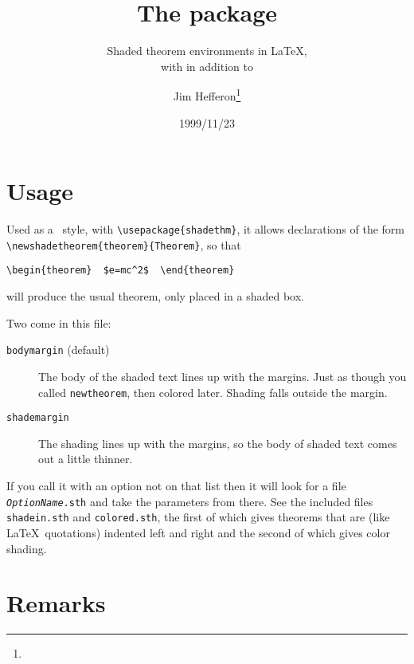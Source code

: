 \documentclass[pagesize=auto, fontsize=12pt, DIV=10]{scrartcl}
\title{The \pkg{shadethm} package}
\subtitle{ Shaded theorem environments in \LaTeX,\\with \cmd{\newshadetheorem} in addition to \cmd{\newtheorem}}
\author{Jim Hefferon\thanks{\mail{hefferon@smcvax.smcvt.edu}}}
\date{1999/11/23}
\newcommand*{\opt}[1]{\texttt{#1}}
\newcommand*{\meta}[1]{\textlangle\textsl{#1}\textrangle}
\begin{document}
\maketitle


\section{Usage}

Used as a \LaTeXe\ style, with \verb|\usepackage{shadethm}|, it allows declarations
of the form \verb|\newshadetheorem{theorem}{Theorem}|, so that
%
\begin{verbatim}
\begin{theorem}  $e=mc^2$  \end{theorem}
\end{verbatim}
%
will produce the usual theorem, only placed in a shaded box.



Two come in this file:
%
\begin{description}
\item[\opt{bodymargin} (default)]
  The body of the shaded text lines up with the
  margins.  Just as though you called \verb|newtheorem|, then colored later.
  Shading falls outside the margin.

\item[\opt{shademargin}]
  The shading lines up with the margins, so the body of
  shaded text comes out a little thinner.
\end{description}
%
If you call it with an option not on that list then it will look for a
file \texttt{\meta{Option\-Name}.sth} and take the parameters from there.  See the included 
files \texttt{shadein.sth} and \texttt{colored.sth}, the first of which gives theorems that are
(like \LaTeX\ quotations) indented left and  right and the second of which 
gives color shading.  


\section{Remarks}
\end{document}
